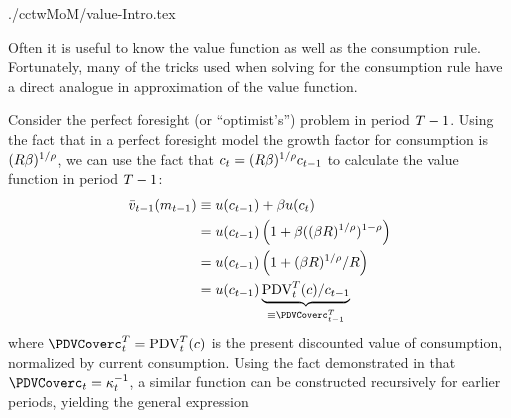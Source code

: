 \documentclass[SolvingMicroDSOPs]{subfiles}
\begin{document}
\begin{verbatimwrite}{./cctwMoM/value-Intro.tex}

  Often it is useful to know the value function as well as the consumption rule.  Fortunately, many of the tricks used when solving for the consumption rule have a direct analogue in approximation of the value function.

  Consider the perfect foresight (or ``optimist's'') problem in period $T-1$.  Using the fact that in a perfect foresight model the growth factor for consumption is $(R \beta)^{1/\rho}$, we can use the fact that $c_{t} = (R \beta)^{1/\rho} c_{t-1}$ to calculate the value function in period $T-1$:
  \begin{equation*}\begin{gathered}\begin{aligned}
        \bar{\vFunc}_{\prd-1}(m_{\prd-1})  & \equiv  \uFunc(\cNrm_{\prd-1})+\DiscFac \uFunc(\cNrm_{\prd})
        \\  & = \uFunc(\cNrm_{\prd-1})\left(1+\DiscFac ((\DiscFac\Rfree)^{1/\CRRA})^{1-\CRRA}\right)
        \\  & = \uFunc(\cNrm_{\prd-1})\left(1+(\DiscFac\Rfree)^{1/\CRRA}/\Rfree\right)
        \\  & = \uFunc(\cNrm_{\prd-1})\underbrace{\mbox{PDV}_{\prd}^{T}(\cNrm)/\cNrm_{\prd-1}}_{\equiv \PDVCoverc_{\prd-1}^{T}}
      \end{aligned}\end{gathered}\end{equation*}
  where $\PDVCoverc_{\prd}^{T}=\mbox{PDV}_{\prd}^{T}(\cNrm)$ is the present discounted value of consumption, normalized by current consumption. Using the fact demonstrated in \cite{BufferStockTheory} that $\PDVCoverc_{\prd}=\MPC^{-1}_{\prd}$, a similar function can be constructed recursively for earlier periods, yielding the general expression \hypertarget{vFuncPF}{}
\end{verbatimwrite}
\unskip
\end{document}
